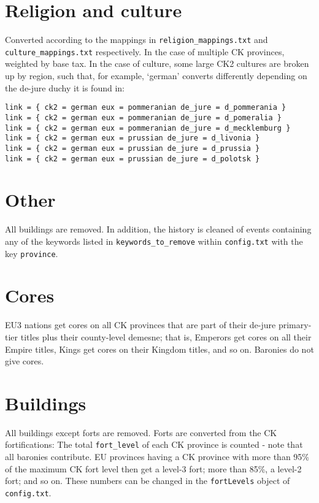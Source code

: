 \documentclass[12pt,ebook,oneside]{book}
\begin{document}
\section{Religion and culture}

\label{sec:provculture}

Converted according to the mappings in \verb|religion_mappings.txt|
and \verb|culture_mappings.txt| respectively. In the case of multiple
CK provinces, weighted by base tax. In the case of culture, some large
CK2 cultures are broken up by region, such that, for example, `german'
converts differently depending on the de-jure duchy it is found in:
\begin{verbatim}
link = { ck2 = german eux = pommeranian de_jure = d_pommerania }
link = { ck2 = german eux = pommeranian de_jure = d_pomeralia }
link = { ck2 = german eux = pommeranian de_jure = d_mecklemburg }
link = { ck2 = german eux = prussian de_jure = d_livonia }
link = { ck2 = german eux = prussian de_jure = d_prussia }
link = { ck2 = german eux = prussian de_jure = d_polotsk }
\end{verbatim} 

\section{Other}

All buildings are removed. In addition, the history is cleaned of
events containing any of the keywords listed in
\verb|keywords_to_remove|
within \verb|config.txt| with the key \verb|province|. 

\section{Cores}

EU3 nations get cores on all CK provinces that are part of their
de-jure primary-tier titles plus their county-level demesne; that is, Emperors get cores on all their
Empire titles, Kings get cores on their Kingdom titles, and so
on. Baronies do not give cores. 

\section{Buildings}

All buildings except forts are removed. Forts are converted from the
CK fortifications: The total \verb|fort_level| of each CK province is
counted - note that all baronies contribute. EU provinces having a CK
province with more than 95\% of the maximum CK fort level then get a
level-3 fort; more than 85\%, a level-2 fort; and so on. These numbers
can be changed in the \verb|fortLevels| object of \verb|config.txt|. 
\end{document}
